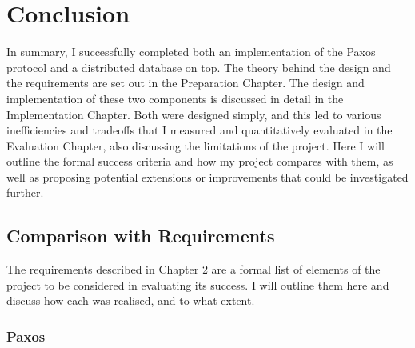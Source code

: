 \documentclass[12pt,twoside,notitlepage]{report}
\begin{document}



\cleardoublepage
\chapter{Conclusion}

In summary, I successfully completed both an implementation of the Paxos protocol and a
distributed database on top. The theory behind the design and the requirements are set out in the
Preparation Chapter. The design and implementation of these two components is discussed in detail
in the Implementation Chapter. Both were designed simply, and this led to various inefficiencies
and tradeoffs that I measured and quantitatively evaluated in the Evaluation Chapter, also
discussing the limitations of the project. Here I will outline the formal success criteria and how
my project compares with them, as well as proposing potential extensions or improvements that
could be investigated further.

\section{Comparison with Requirements}

The requirements described in Chapter 2 are a formal list of elements of the project to be
considered in evaluating its success. I will outline them here and discuss how each was realised,
and to what extent.

\subsection{Paxos}
\end{document}
